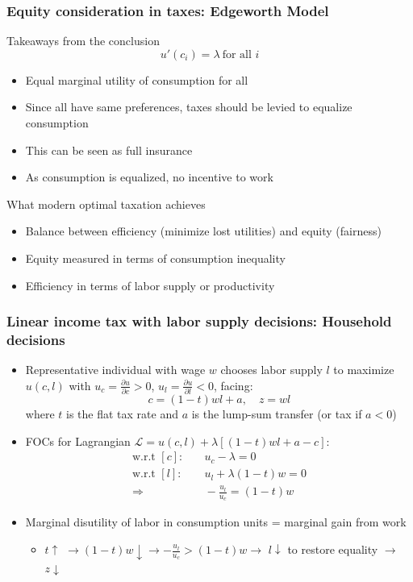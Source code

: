 \documentclass[aspectratio=169]{beamer}
\begin{document}
\begin{frame}
\frametitle{Equity consideration in taxes: Edgeworth Model}
Takeaways from the conclusion
\[
 u'(c_i)=\lambda \ \text{for all } i
 \]\vspace{-10pt}
\begin{itemize}\setlength\itemsep{3pt}
\item Equal marginal utility of consumption for all
\item Since all have same preferences, taxes should be levied to equalize consumption
\item This can be seen as full insurance
\item As consumption is equalized, no incentive to work 
\end{itemize} \medskip
What modern optimal taxation achieves
\begin{itemize}\setlength\itemsep{3pt}
\item Balance between efficiency (minimize lost utilities) and equity (fairness)
\item Equity measured in terms of consumption inequality
\item Efficiency in terms of labor supply or productivity
\end{itemize} \medskip
\end{frame}

\begin{frame}
\frametitle{Linear income tax with labor supply decisions: Household decisions}

\begin{itemize}\setlength\itemsep{3pt}
\item Representative individual with wage $w$ chooses labor supply $l$ to maximize
$u(c, l)$ with $u_c =\frac{\partial u}{\partial c}> 0$, $u_l=\frac{\partial u}{\partial l} < 0$, facing:
\[
        c = (1-t)wl + a, \quad z = wl
\]
where $t$ is the flat tax rate and $a$ is the lump-sum transfer (or tax if $a<0$)
\item FOCs for Lagrangian $\mathcal{L}=u(c,l)+\lambda[(1-t)wl+a-c]$:
\[
    \begin{aligned}
\text{w.r.t }[c]:& \quad u_c -\lambda=0 \\
\text{w.r.t }[l]:& \quad u_l + \lambda(1-t)w=0\\
\Rightarrow &\quad-\frac{u_l}{u_c}=(1-t)w
    \end{aligned}
\]
\item Marginal disutility of labor in consumption units = marginal gain from work
\begin{itemize}\setlength\itemsep{3pt}
\item $t\uparrow$ $\to(1-t)w\downarrow \to -\frac{u_l}{u_c}>(1-t)w\to$ $l\downarrow$ to restore equality $\to$ $z\downarrow$
\end{itemize}
\end{itemize}
\end{frame}
\end{document}
